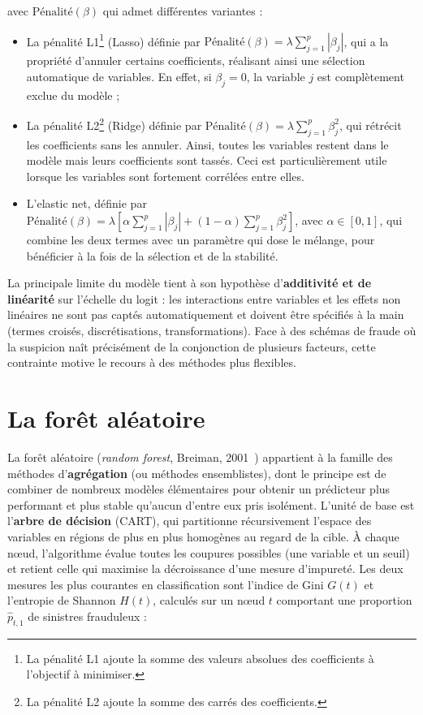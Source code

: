 avec $\text{Pénalité}(\beta)$ qui admet différentes variantes :

\begin{itemize}
    \item[$\bullet$] La pénalité L1\footnote{La pénalité L1 ajoute la somme des valeurs absolues des coefficients à l'objectif à minimiser.} (Lasso) définie par $\text{Pénalité}(\beta) = \lambda \sum_{j=1}^{p} | \beta_j |$, qui a la propriété d'annuler certains coefficients, réalisant ainsi une sélection automatique de variables. En effet, si $\beta_j = 0$, la variable $j$ est complètement exclue du modèle ;
    \item[$\bullet$] La pénalité L2\footnote{La pénalité L2 ajoute la somme des carrés des coefficients.} (Ridge) définie par $\text{Pénalité}(\beta) = \lambda \sum_{j=1}^{p} \beta_j^2$, qui rétrécit les coefficients sans les annuler. Ainsi, toutes les variables restent dans le modèle mais leurs coefficients sont tassés. Ceci est particulièrement utile lorsque les variables sont fortement corrélées entre elles.
    \item[$\bullet$] L'elastic net, définie par $\text{Pénalité}(\beta) = \lambda \left[ \alpha \sum_{j=1}^{p} | \beta_j | + (1 - \alpha) \sum_{j=1}^{p} \beta_j^2 \right]$, avec $\alpha \in [0, 1]$, qui combine les deux termes avec un paramètre qui dose le mélange, pour bénéficier à la fois de la sélection et de la stabilité.
\end{itemize}

La principale limite du modèle tient à son hypothèse d'\textbf{additivité et de linéarité} sur l'échelle du logit : les interactions entre variables et les effets non linéaires ne sont pas captés automatiquement et doivent être spécifiés à la main (termes croisés, discrétisations, transformations). Face à des schémas de fraude où la suspicion naît précisément de la conjonction de plusieurs facteurs, cette contrainte motive le recours à des méthodes plus flexibles.

\section{La forêt aléatoire}

La forêt aléatoire (\textit{random forest}, Breiman, 2001~\cite{breiman_rf}) appartient à la famille des méthodes d'\textbf{agrégation} (ou méthodes ensemblistes), dont le principe est de combiner de nombreux modèles élémentaires pour obtenir un prédicteur plus performant et plus stable qu'aucun d'entre eux pris isolément. L'unité de base est l'\textbf{arbre de décision} (CART), qui partitionne récursivement l'espace des variables en régions de plus en plus homogènes au regard de la cible. À chaque nœud, l'algorithme évalue toutes les coupures possibles (une variable et un seuil) et retient celle qui maximise la décroissance d'une mesure d'impureté. Les deux mesures les plus courantes en classification sont l'indice de Gini $G(t)$ et l'entropie de Shannon $H(t)$, calculés sur un nœud $t$ comportant une proportion $\hat{p}_{t,1}$ de sinistres frauduleux :


